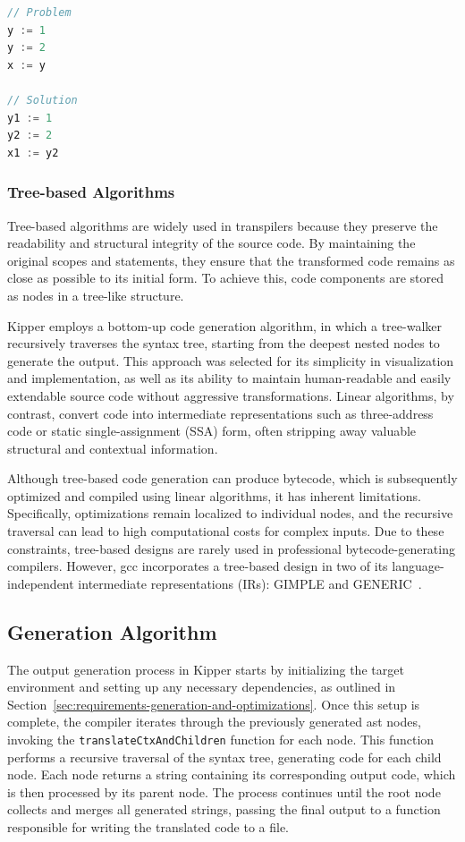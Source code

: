\begin{lstlisting}[language=TypeScript,caption=Static single-assignment form,label=lst:implementation:staticsingleassignmentform]
// Problem
y := 1
y := 2
x := y

// Solution
y1 := 1
y2 := 2
x1 := y2
\end{lstlisting}

\subsubsection{Tree-based Algorithms}

Tree-based algorithms are widely used in \gls{transpiler}s because they preserve the readability and structural integrity of the source code. By maintaining the original scopes and statements, they ensure that the transformed code remains as close as possible to its initial form. To achieve this, code components are stored as nodes in a tree-like structure.

Kipper employs a bottom-up code generation algorithm, in which a tree-walker recursively traverses the syntax tree, starting from the deepest nested nodes to generate the output. This approach was selected for its simplicity in visualization and implementation, as well as its ability to maintain human-readable and easily extendable source code without aggressive transformations. Linear algorithms, by contrast, convert code into intermediate representations such as three-address code or static single-assignment (SSA) form, often stripping away valuable structural and contextual information.

Although tree-based code generation can produce bytecode, which is subsequently optimized and compiled using linear algorithms, it has inherent limitations. Specifically, optimizations remain localized to individual nodes, and the recursive traversal can lead to high computational costs for complex inputs. Due to these constraints, tree-based designs are rarely used in professional bytecode-generating compilers. However, \acrshort{gcc} incorporates a tree-based design in two of its language-independent intermediate representations (IRs): GIMPLE and GENERIC~\cite{gcc:gimpletuples}.

\subsection{Generation Algorithm}

The output generation process in Kipper starts by initializing the target environment and setting up any necessary dependencies, as outlined in Section~\ref{sec:requirements-generation-and-optimizations}. Once this setup is complete, the compiler iterates through the previously generated \acrshort{ast} nodes, invoking the \lstinline|translateCtxAndChildren| function for each node. This function performs a recursive traversal of the syntax tree, generating code for each child node. Each node returns a string containing its corresponding output code, which is then processed by its parent node. The process continues until the root node collects and merges all generated strings, passing the final output to a function responsible for writing the translated code to a file.

